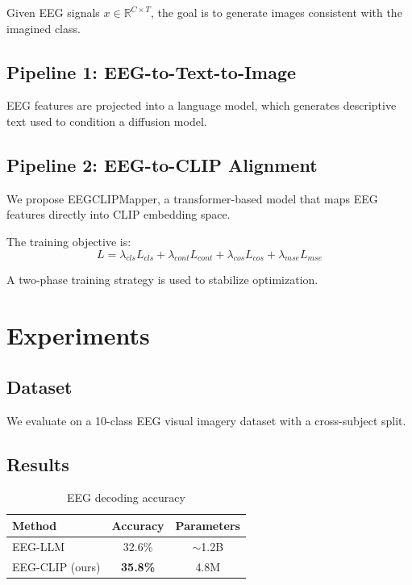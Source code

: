 Given EEG signals $x \in \mathbb{R}^{C \times T}$, the goal is to generate images consistent with the imagined class.

\subsection{Pipeline 1: EEG-to-Text-to-Image}

EEG features are projected into a language model, which generates descriptive text used to condition a diffusion model.

\subsection{Pipeline 2: EEG-to-CLIP Alignment}

We propose EEGCLIPMapper, a transformer-based model that maps EEG features directly into CLIP embedding space.

The training objective is:
\begin{equation}
L = \lambda_{cls} L_{cls} + \lambda_{cont} L_{cont} + \lambda_{cos} L_{cos} + \lambda_{mse} L_{mse}
\end{equation}

A two-phase training strategy is used to stabilize optimization.

\section{Experiments}

\subsection{Dataset}

We evaluate on a 10-class EEG visual imagery dataset with a cross-subject split.

\subsection{Results}

\begin{table}[t]
\centering
\begin{tabular}{lcc}
\hline
Method & Accuracy & Parameters \\
\hline
EEG-LLM & 32.6\% & $\sim$1.2B \\
EEG-CLIP (ours) & \textbf{35.8\%} & 4.8M \\
\hline
\end{tabular}
\caption{EEG decoding accuracy}
\end{table}

